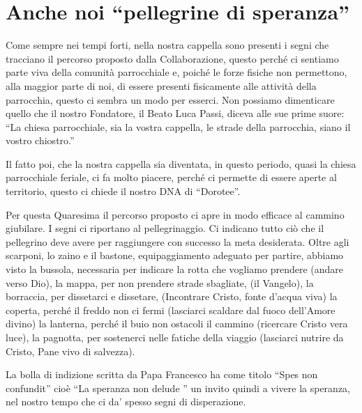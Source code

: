 \section{Anche noi ``pellegrine di speranza''}

Come sempre nei tempi forti, nella nostra cappella sono presenti i segni che tracciano il percorso proposto dalla Collaborazione, questo perché ci sentiamo parte viva della comunità parrocchiale e, poiché le forze fisiche non permettono, alla maggior parte di noi, di essere presenti fisicamente alle attività della parrocchia, questo ci sembra un modo per esserci. Non possiamo dimenticare quello che il nostro Fondatore, il Beato Luca Passi, diceva alle sue prime suore: ``La chiesa parrocchiale, sia la vostra cappella, le strade della parrocchia, siano il vostro chiostro.''


Il fatto poi, che la nostra cappella sia diventata, in questo periodo, quasi la chiesa parrocchiale feriale, ci fa molto piacere, perché ci permette di essere aperte al territorio, questo ci chiede il nostro DNA di ``Dorotee''.

Per questa Quaresima il percorso proposto ci apre in modo efficace al cammino giubilare. I segni ci riportano al pellegrinaggio. Ci indicano tutto ciò che il pellegrino deve avere per raggiungere con successo la meta desiderata. Oltre agli scarponi, lo zaino e il bastone, equipaggiamento adeguato per partire, abbiamo visto la bussola, necessaria per indicare la rotta che vogliamo prendere (andare verso Dio), la mappa, per non prendere strade sbagliate, (il Vangelo), la borraccia, per dissetarci e dissetare, (Incontrare Cristo, fonte d'acqua viva) la coperta, perché il freddo non ci fermi (lasciarci scaldare dal fuoco dell'Amore divino) la lanterna, perché il buio non ostacoli il cammino (ricercare Cristo vera luce), la pagnotta, per sostenerci nelle fatiche della viaggio (lasciarci nutrire da Cristo, Pane vivo di salvezza).

La bolla di indizione scritta da Papa Francesco ha come titolo ``Spes non confundit'' cioè ``La speranza non delude '' un invito quindi a vivere la speranza, nel nostro tempo che ci da' spesso segni di disperazione.


